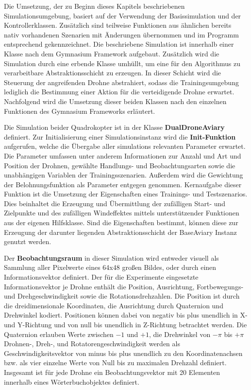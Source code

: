 Die Umsetzung, der zu Beginn dieses Kapitels beschriebenen Simulationsumgebung, basiert auf der Verwendung der Basissimulation und der Kontrollerklassen. 
Zusätzlich sind teilweise Funktionen aus ähnlichen bereits nativ vorhandenen Szenarien mit Änderungen übernommen und im Programm entsprechend gekennzeichnet.
Die beschriebene Simulation ist innerhalb einer Klasse nach dem Gymnasium Framework aufgebaut.
Zusätzlich wird die Simulation durch eine erbende Klasse umhüllt, um eine für den Algorithmus zu verarbeitbare Abstraktionsschicht zu erzeugen.
In dieser Schicht wird die Steuerung der angreifenden Drohne abstrahiert, sodass die Trainingsumgebung lediglich die Bestimmung einer Aktion für die verteidigende Drohne erwartet.
Nachfolgend wird die Umsetzung dieser beiden Klassen nach den einzelnen Funktionen des Gymnasium Frameworks erläutert.

Die Simulation beider Quadrokopter ist in der Klasse \textbf{DualDroneAviary} definiert.
Zur Initialisierung einer Simulationsinstanz wird die \textbf{Init-Funktion} aufgerufen, welche die Übergabe aller simulations relevanten Parameter erwartet.
Die Parameter umfassen unter anderem Informationen zur Anzahl und Art und Position der Drohnen, gewählte Handlungs- und Beobachtungsarten sowie die unabhängigen Variablen der Trainingsszenarien.
Außerdem wird die Gewichtung der Belohnungsfunktion als Parameter entgegen genommen.
Kernaufgabe dieser Funktion ist die Umsetzung der Eigenschaften eines Trainings- und Testszenarios.
Dies beinhaltet die Erzeugung und Übermittlung der zufälligen Start- und Zielpunkte und des zufälligen Windeffektes mittels unterstützender Funktionen aus der eigenen Hilfsklasse.
Sind die Eigenschaften bestimmt, können diese zur Erzeugung der darunter liegenden Abstraktionsschicht der BaseAviary Instanz genutzt werden.

Der \textbf{Beobachtungsraum} in dieser Simulation wird entweder visuell als Sammlung aller Pixelwerte eines 64x48 großen Bildes, oder durch einen Informationsvektor definiert.
Der für die Experimente eingesetzte Informationsvektor je Drohne enthält die Position, Ausrichtung, Fortbewegungs- und Drehgeschwindigkeit sowie die Rotationsdrehzahlen.
Die Position ist durch die dreidimensionale Koordinaten, die Ausrichtung durch Quaternion und Drehwinkel kodiert.
Positionen können dabei von negativ bis plus unendlich in X- und Y-Richtung und von null bis unendlich in Z-Richtung betrachtet werden.
Die Quaternion erlauben Werte zwischen $-1$ und $+1$, die Drehwinkel von $-\pi$ bis $+\pi$
Drohnen-, Dreh-, und Rotatorengeschwindigkeit werden als Geschwindigkeitsvektor von minus bis plus unendlich zu den Koordinatenachsen bzw. als vier einzelne Werte von Null bis zu maximalen Drehzahl definiert.
Insgesamt ist für jede Drohne ein Beobachtungsvektor mit 20 Elementen innerhalb eines Wörterbuchobjektes definiert.

